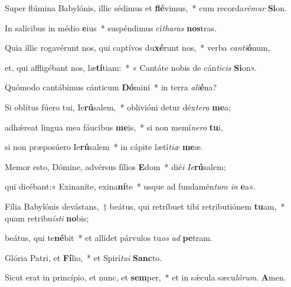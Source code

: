 \item Super flúmina Babylónis, illic sédimus et \textbf{flé}vimus,~* cum recorda\textit{ré}\textit{mur} \textbf{Si}on.

\item In salícibus in médio \textbf{e}ius~* suspéndimus cí\textit{tha}\textit{ras} \textbf{nos}tras.

\item Quia illic rogavérunt nos, qui captívos du\textbf{xé}runt nos,~* verba \textit{can}\textit{ti}\textbf{ó}num,

\item et, qui affligébant nos, læ\textbf{tí}tiam:~* « Cantáte nobis de cán\textit{ti}\textit{cis} \textbf{Si}on».

\item Quómodo cantábimus cánticum \textbf{Dó}mini~* in terra \textit{a}\textit{li}\textbf{é}na?

\item Si oblítus fúero tui, Ie\textbf{rú}salem,~* oblivióni detur déx\textit{te}\textit{ra} \textbf{me}a;

\item adhǽreat lingua mea fáucibus \textbf{me}is,~* si non memí\textit{ne}\textit{ro} \textbf{tu}i,

\item si non præposúero Ie\textbf{rú}salem~* in cápite lætí\textit{ti}\textit{æ} \textbf{me}æ.

\item Memor esto, Dómine, advérsus fílios \textbf{E}dom~* dié\textit{i} \textit{Ie}\textbf{rú}salem;

\item qui dicébant:« Exinaníte, exina\textbf{ní}te~* usque ad fundamén\textit{tum} \textit{in} \textbf{e}a».

\item Fília Babylónis devástans,~† beátus, qui retríbuet tibi retributiónem \textbf{tu}am,~* quam retribu\textit{ís}\textit{ti} \textbf{no}bis;

\item beátus, qui te\textbf{né}bit~* et allídet párvulos tu\textit{os} \textit{ad} \textbf{pe}tram.

\item Glória Patri, et \textbf{Fí}lio,~* et Spirí\textit{tu}\textit{i} \textbf{Sanc}to.

\item Sicut erat in princípio, et nunc, et \textbf{sem}per,~* et in sǽcula sæcu\textit{ló}\textit{rum}. \textbf{A}men.